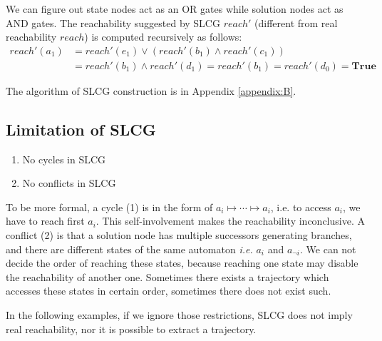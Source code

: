 \documentclass[runningheads]{llncs}
\begin{document}
We can figure out state nodes act as an OR gates while solution nodes act as AND gates. The reachability suggested by SLCG $reach'$ (different from real reachability $reach$) is computed recursively as follows:
\begin{align*}
reach'(a_1)&=reach'(e_1)\lor (reach'(b_1)\land reach'(c_1))\\
&=reach'(b_1)\land reach'(d_1)=reach'(b_1)=reach'(d_0)=\mathbf{True}
\end{align*}

The algorithm of SLCG construction is in Appendix \ref{appendix:B}.


\subsection{Limitation of SLCG}\label{limitation}

\begin{enumerate}
\item No cycles in SLCG
\item No conflicts in SLCG

\end{enumerate}
To be more formal, a cycle (1) is in the form of $a_i\mapsto\cdots\mapsto a_i$, i.e. to access $a_i$, we have to reach first $a_i$. This self-involvement makes the reachability inconclusive. 
A conflict (2) is that a solution node has multiple successors generating branches, and there are different states of the same automaton \textit{i.e.} $a_i$ and $a_{\lnot i}$. 
We can not decide the order of reaching these states, because reaching one state may disable the reachability of another one.
Sometimes there exists a trajectory which accesses these states in certain order, sometimes there does not exist such.

In the following examples, if we ignore those restrictions, SLCG does not imply real reachability, nor it is possible to extract a trajectory.
\end{document}
